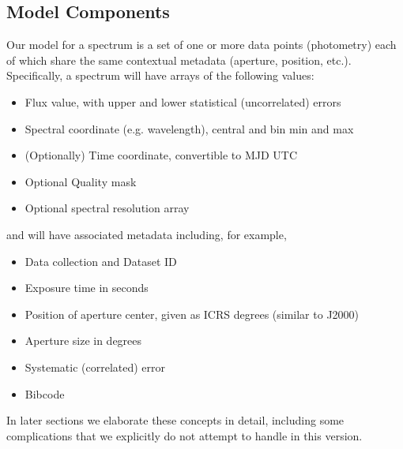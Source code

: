 \documentclass[11pt]{article}
\begin{document}
\subsection{Model Components}

Our model for a spectrum is a set of one or more data points (photometry)  each of
which share the same contextual metadata  (aperture, position,
etc.). Specifically, a spectrum
will have arrays of the following values:

\vskip 0.1in

\colorbox{ipink}{
\begin{minipage}{0.9\textwidth}

\begin{itemize}
\item Flux value, with upper and lower statistical (uncorrelated) errors 
\item Spectral coordinate  (e.g. wavelength), central and bin min and max 
\item (Optionally) Time coordinate, convertible to MJD UTC
\item Optional Quality mask
\item Optional spectral resolution array
\end{itemize}
\end{minipage}
}

\vskip 0.1in

and will have associated metadata including, for example,

\vskip 0.1in

\colorbox{ipink}{
\begin{minipage}{0.9\textwidth}
\begin{itemize}
\item Data collection and Dataset ID
\item Exposure time in seconds
\item Position of aperture center, given as ICRS degrees
(similar to J2000)
\item Aperture size in degrees
\item Systematic (correlated) error
\item Bibcode
\end{itemize}
\end{minipage}
}

\vskip 0.1in

In later sections we elaborate these concepts in detail, including some
complications that we explicitly do not attempt to handle in this
version.
\end{document}
